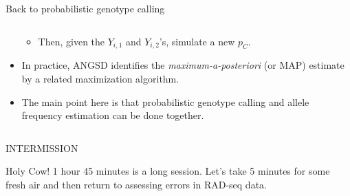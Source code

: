 \documentclass[letter,graphicx]{beamer}
\begin{document}
\begin{frame}{Back to probabilistic genotype calling}
\begin{columns}
\begin{column}{0.69\textwidth}
\begin{itemize}
\begin{itemize}
		\item Then, given the $Y_{i,1}$ and $Y_{i,2}$'s, simulate a new $p_C$.
		\end{itemize}
		\item In practice, ANGSD identifies the {\em maximum-a-posteriori} (or MAP) estimate 
		by a related maximization algorithm.
		\item The main point here is that probabilistic genotype calling and allele frequency
		estimation can be done together.
        \end{itemize}
    \end{column}
\end{columns}
\end{frame}








\begin{frame}{INTERMISSION}
\begin{center}
\LARGE Holy Cow! 1 hour 45 minutes is a long session.  Let's take 5 minutes for some
fresh air and then return to assessing errors in RAD-seq data.
\end{center}
\end{frame}
\end{document}
